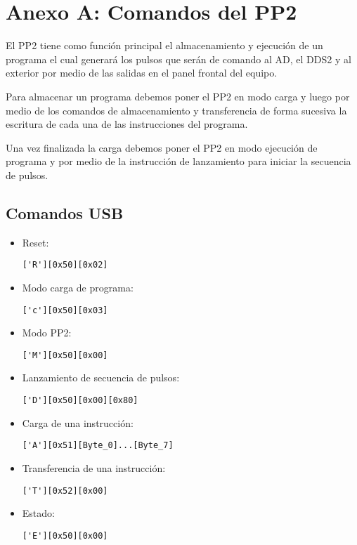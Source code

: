 \section{Anexo A: Comandos del PP2}

El PP2 tiene como funci\'on principal el almacenamiento y ejecuci\'on de un 
programa el cual generar\'a los pulsos que ser\'an de comando al AD, el DDS2
y al exterior por medio de las salidas en el panel frontal del equipo.
 
Para almacenar un programa debemos poner el PP2 en modo carga y luego
por medio de los comandos de almacenamiento y transferencia de forma sucesiva
la escritura de cada una de las instrucciones del programa.

Una vez finalizada la carga debemos poner el PP2 en modo ejecuci\'on de programa
y por medio de la instrucci\'on de lanzamiento para iniciar la secuencia de pulsos.

\subsection{Comandos USB}
\begin{itemize}
\item Reset: \begin{verbatim}['R'][0x50][0x02]\end{verbatim}
\item Modo carga de programa: \begin{verbatim}['c'][0x50][0x03]\end{verbatim}
\item Modo PP2: \begin{verbatim}['M'][0x50][0x00]\end{verbatim}
\item Lanzamiento de secuencia de pulsos: \begin{verbatim}['D'][0x50][0x00][0x80]\end{verbatim}
\item Carga de una instrucci\'on: \begin{verbatim}['A'][0x51][Byte_0]...[Byte_7]\end{verbatim}
\item Transferencia de una instrucci\'on: \begin{verbatim}['T'][0x52][0x00]\end{verbatim}
\item Estado: \begin{verbatim}['E'][0x50][0x00]\end{verbatim}
\end{itemize}
\newpage
